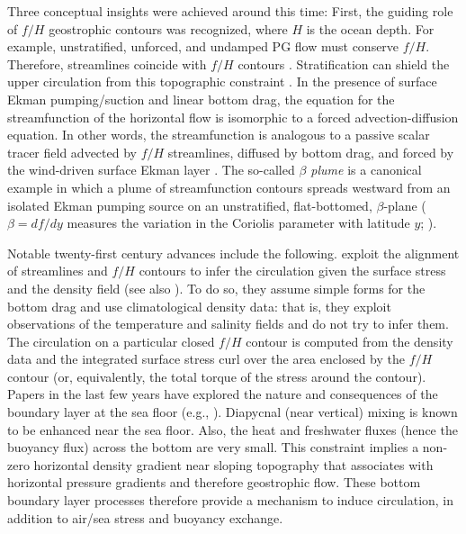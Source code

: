 \documentclass{ametsocV6.2}
\begin{document}
Three conceptual insights were achieved around this time: First, the guiding role of $f/H$ geostrophic contours was recognized, where $H$ is the ocean depth.
For example, unstratified, unforced, and undamped PG flow must conserve $f/H$. 
Therefore, streamlines coincide with $f/H$ contours \citep{welander68}.
Stratification can shield the upper circulation from this topographic constraint \citep{anderson&gill75, rhines&young82, marshall95, spall16}.
In the presence of surface Ekman pumping/suction and linear bottom drag, the equation for the streamfunction of the horizontal flow is isomorphic to a forced advection-diffusion equation.
In other words, the streamfunction is analogous to a passive scalar tracer field advected by $f/H$ streamlines, diffused by bottom drag, and forced by the wind-driven surface Ekman layer \citep{welander68}.
The so-called \emph{$\beta$ plume} is a canonical example in which a plume of streamfunction contours spreads westward from an isolated Ekman pumping source on an unstratified, flat-bottomed, $\beta$-plane ($\beta = d f / dy$ measures the variation in the Coriolis parameter with latitude $y$; \citealt{stommel82}).

Notable twenty-first century advances include the following.
\citet{nost&isachsen03} exploit the alignment of streamlines and $f/H$ contours to infer the circulation given the surface stress and the density field (see also \citealt{aaboe&nost08,nilsson_etal24}).
To do so, they assume simple forms for the bottom drag and use climatological density data: that is, they exploit observations of the temperature and salinity fields and do not try to infer them.
The circulation on a particular closed $f/H$ contour is computed from the density data and the integrated surface stress curl over the area enclosed by the $f/H$ contour (or, equivalently, the total torque of the stress around the contour).
Papers in the last few years have explored the nature and consequences of the boundary layer at the sea floor (e.g., \citealt{peterson&callies23,peterson&callies26}).
Diapycnal (near vertical) mixing is known to be enhanced near the sea floor. 
Also, the heat and freshwater fluxes (hence the buoyancy flux) across the bottom are very small.
This constraint implies a non-zero horizontal density gradient near sloping topography that associates with horizontal pressure gradients and therefore geostrophic flow.
These bottom boundary layer processes therefore provide a mechanism to induce circulation, in addition to air/sea stress and buoyancy exchange.
\end{document}
